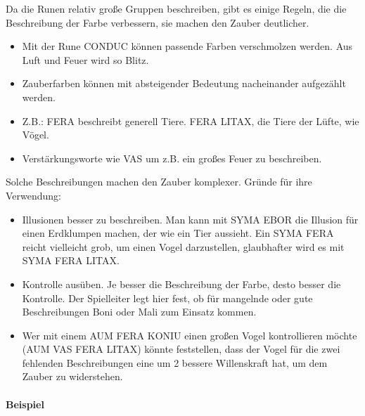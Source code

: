 \documentclass{article}
\begin{document}
Da die Runen relativ große Gruppen beschreiben, gibt es einige Regeln, die die Beschreibung der Farbe verbessern, sie
machen den Zauber deutlicher.

\begin{itemize}
\item Mit der Rune CONDUC können passende Farben verschmolzen werden. Aus Luft und Feuer wird so Blitz.
\item Zauberfarben können mit absteigender Bedeutung nacheinander aufgezählt werden.
\item Z.B.: FERA beschreibt generell Tiere. FERA LITAX, die Tiere der Lüfte, wie Vögel.
\item Verstärkungsworte wie VAS um z.B. ein großes Feuer zu beschreiben.
\end{itemize}

Solche Beschreibungen machen den Zauber komplexer. Gründe für ihre Verwendung:

\begin{itemize}
\item Illusionen besser zu beschreiben. Man kann mit SYMA EBOR die Illusion für einen Erdklumpen machen, der wie ein Tier aussieht. Ein SYMA FERA reicht vielleicht grob, um einen Vogel darzustellen, glaubhafter wird es mit SYMA FERA LITAX.
\item Kontrolle ausüben. Je besser die Beschreibung der Farbe, desto besser die Kontrolle. Der Spielleiter legt hier fest, ob für mangelnde oder gute Beschreibungen Boni oder Mali zum Einsatz kommen.
\item Wer mit einem AUM FERA KONIU einen großen Vogel kontrollieren möchte (AUM VAS FERA LITAX) könnte feststellen, dass der Vogel für die zwei fehlenden Beschreibungen eine um 2 bessere Willenskraft hat, um dem Zauber zu widerstehen.
\end{itemize}

\paragraph{Beispiel}
\end{document}
